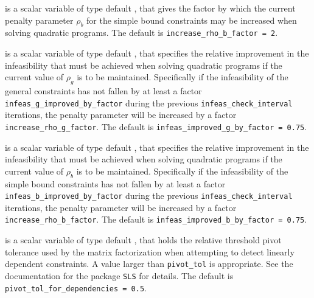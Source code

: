 \begin{description}
 is a scalar variable of type default \realdp,
that gives the factor by which the current penalty parameter $\rho_b$ for
the simple bound constraints may be increased when solving quadratic programs.
The default is {\tt increase\_rho\_b\_factor = 2}.

 is a scalar variable of type default
\realdp, that specifies the relative improvement in the infeasibility
that must be achieved when solving quadratic programs if the current
value of $\rho_g$ is to be maintained.
Specifically if the infeasibility of the general constraints
has not fallen by at least a factor {\tt infeas\_g\_improved\_by\_factor}
during the previous {\tt infeas\_check\_interval} iterations, the
penalty parameter will be increased by a factor
{\tt increase\_rho\_g\_factor}.
The default is {\tt infeas\_im\-proved\_g\_by\_factor = 0.75}.

 is a scalar variable of type default
\realdp, that specifies the relative improvement in the infeasibility
that must be achieved when solving quadratic programs if the current
value of $\rho_b$ is to be maintained.
Specifically if the infeasibility of the simple bound constraints
has not fallen by at least a factor {\tt infeas\_b\_improved\_by\_factor}
during the previous {\tt infeas\_check\_in\-terval} iterations, the
penalty parameter will be increased by a factor
{\tt increase\_rho\_b\_factor}.
The default is {\tt infeas\_im\-proved\_b\_by\_factor = 0.75}.


 is a scalar variable of type default
\realdp, that holds the relative
threshold pivot  tolerance used by the matrix factorization when
attempting to detect linearly dependent constraints. A value larger
than  {\tt pivot\_tol} is appropriate. See
the documentation for the package {\tt SLS} for details.
The default is {\tt pivot\_tol\_for\_dependencies = 0.5}.



\end{description}
